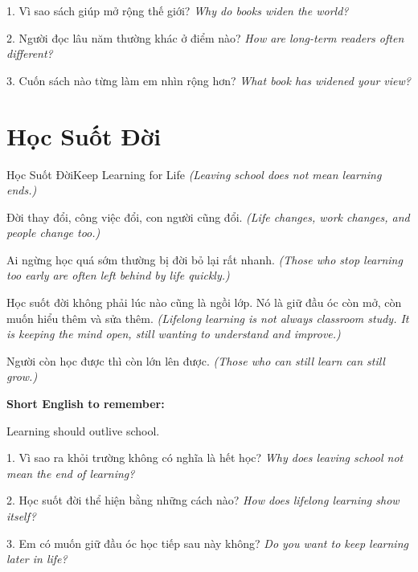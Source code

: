 \begin{tuhocnhanh}
1. Vì sao sách giúp mở rộng thế giới? \textit{Why do books widen the world?}

2. Người đọc lâu năm thường khác ở điểm nào? \textit{How are long-term readers often different?}

3. Cuốn sách nào từng làm em nhìn rộng hơn? \textit{What book has widened your view?}
\end{tuhocnhanh}
\ngancach

\section{Học Suốt Đời}
\begin{truyen}{Học Suốt Đời}{Keep Learning for Life}
\textit{(Leaving school does not mean learning ends.)}

Đời thay đổi, công việc đổi, con người cũng đổi.
\textit{(Life changes, work changes, and people change too.)}

Ai ngừng học quá sớm thường bị đời bỏ lại rất nhanh.
\textit{(Those who stop learning too early are often left behind by life quickly.)}

Học suốt đời không phải lúc nào cũng là ngồi lớp. Nó là giữ đầu óc còn mở, còn muốn hiểu thêm và sửa thêm.
\textit{(Lifelong learning is not always classroom study. It is keeping the mind open, still wanting to understand and improve.)}
\end{truyen}

\begin{baihoc}
Người còn học được thì còn lớn lên được.
\textit{(Those who can still learn can still grow.)}
\end{baihoc}

\begin{ghinhoanh}
\textbf{Short English to remember:}

Learning should outlive school.

\end{ghinhoanh}

\begin{tuhocnhanh}
1. Vì sao ra khỏi trường không có nghĩa là hết học? \textit{Why does leaving school not mean the end of learning?}

2. Học suốt đời thể hiện bằng những cách nào? \textit{How does lifelong learning show itself?}

3. Em có muốn giữ đầu óc học tiếp sau này không? \textit{Do you want to keep learning later in life?}
\end{tuhocnhanh}
\ngancach


